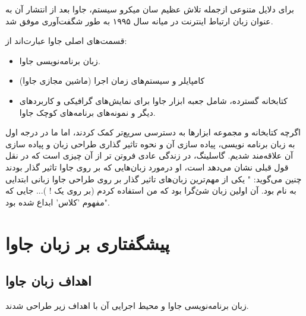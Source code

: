 \documentclass[a4paper,12pt]{report}
\begin{document}
	برای دلایل متنوعی ازجمله تلاش عظیم سان میکرو سیستم، ‌جاوا بعد از انتشار آن به عنوان زبان ارتباط اینترنت در میانه سال ۱۹۹۵ به طور شگفت‌آوری موفق شد.
	
	قسمت‌های اصلی جاوا عبارت‌اند از:
	
	\begin{itemize}
		\renewcommand{\labelitemi}{\color{gray}\scriptsize$\blacksquare$}
		\item 
		زبان برنامه‌نویسی جاوا.
		\item
			کامپایلر و سیستم‌های زمان اجرا (ماشین مجازی جاوا)
		\item
		کتابخانه گسترده، شامل جعبه ابزار جاوا برای نمایش‌های گرافیکی و کاربرد‌های دیگر و نمونه‌های برنامه‌های کوچک جاوا.
	\end{itemize}

		اگرچه کتابخانه و مجموعه ابزارها به دسترسی سریع‌تر کمک کردند،‌ اما ما در درجه اول به زبان برنامه نویسی، پیاده سازی آن و نحوه تاثیر گذاری طراحی زبان و پیاده سازی آن علاقه‌مند شدیم.
	گاسلینگ،‌ در زندگی عادی فروتن تر از آن چیزی است که در نقل قول قبلی نشان می‌دهد است، او درمورد زبان‌هایی که بر روی جاوا تاثیر گذار بودند چنین می‌گوید: " یکی از مهم‌ترین زبان‌های تاثیر گذار بر روی طراحی جاوا زبانی ابتدایی به نام 
	\textit{}
	بود. آن اولین زبان شئ‌گرا بود که من استفاده کردم (بر روی یک 
	!
	)... جایی که مفهوم 'کلاس' ابداع شده بود".
	
	\section{پیشگفتاری بر زبان جاوا}\label{sec1:chap13}
	\subsection{اهداف زبان جاوا}\label{subsec1:sec1:chap13}
	
	زبان برنامه‌نویسی جاوا و محیط اجرایی آن با اهداف زیر طراحی شدند.
	
\end{document}
